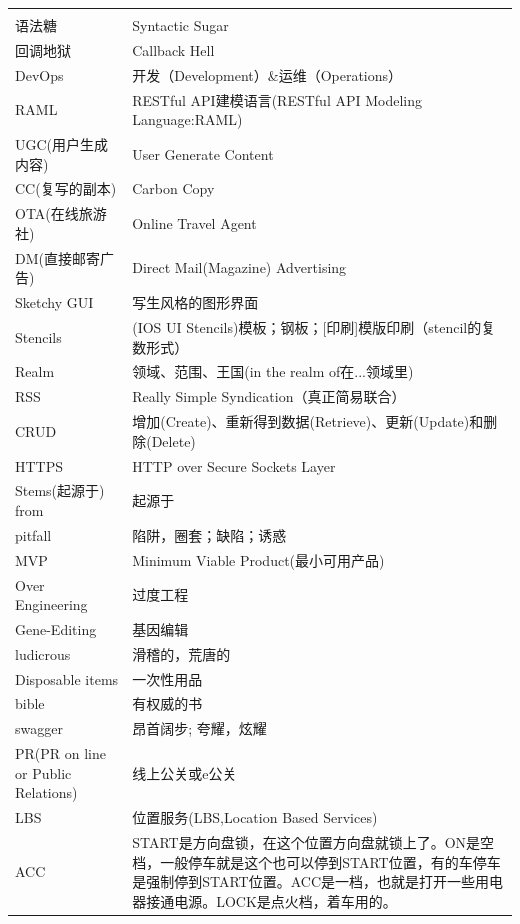 \documentclass{book}
\begin{document}
\begin{longtable}{lp{8cm}}
	\multirow{1}{*}{}			
	& \multicolumn{1}{c}{}\\
	语法糖 & Syntactic Sugar\footnotemark[5]\\
	回调地狱 & Callback Hell\\
	DevOps  & 开发（Development）\&运维（Operations）\\
	RAML & RESTful API建模语言(RESTful API Modeling Language:RAML)\\
	UGC(用户生成内容) & User Generate Content\\
	CC(复写的副本) & Carbon Copy\\
	OTA(在线旅游社) & Online Travel Agent\\
	DM(直接邮寄广告) & Direct Mail(Magazine) Advertising\\
	Sketchy GUI & 写生风格的图形界面\\
	Stencils & (IOS UI Stencils)模板；钢板；[印刷]模版印刷（stencil的复数形式）\\
	Realm & 领域、范围、王国(in the realm of在...领域里)\\
	RSS & Really Simple Syndication（真正简易联合）\\
	CRUD & 增加(Create)、重新得到数据(Retrieve)、更新(Update)和删除(Delete)\\
	HTTPS & HTTP over Secure Sockets Layer\\
	Stems(起源于) from & 起源于\\
	pitfall & 陷阱，圈套；缺陷；诱惑\\
	MVP & Minimum Viable Product(最小可用产品)\\
	Over Engineering & 过度工程\\
	Gene-Editing & 基因编辑\\
	ludicrous & 滑稽的，荒唐的\\
	Disposable items & 一次性用品\\
	bible & 有权威的书\\
	swagger & 昂首阔步; 夸耀，炫耀\\
	PR(PR on line or Public Relations) & 线上公关或e公关\\
	LBS & 位置服务(LBS,Location Based Services)\\
	ACC & START是方向盘锁，在这个位置方向盘就锁上了。ON是空档，一般停车就是这个也可以停到START位置，有的车停车是强制停到START位置。ACC是一档，也就是打开一些用电器接通电源。LOCK是点火档，着车用的。\\
\end{longtable}

\end{document}

